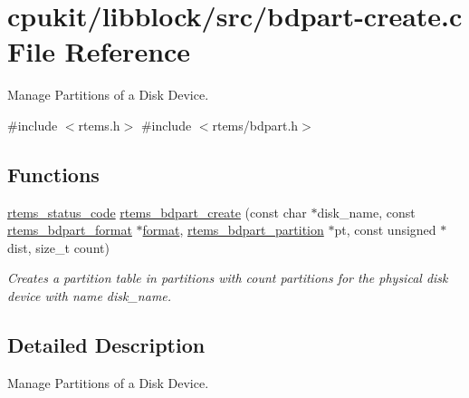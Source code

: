 \hypertarget{bdpart-create_8c}{}\section{cpukit/libblock/src/bdpart-\/create.c File Reference}
\label{bdpart-create_8c}


Manage Partitions of a Disk Device.  


{\ttfamily \#include $<$rtems.\+h$>$}\newline
{\ttfamily \#include $<$rtems/bdpart.\+h$>$}\newline
\subsection*{Functions}
\begin{DoxyCompactItemize}
\item 
\mbox{\hyperlink{group__ClassicStatus_ga545d41846817eaba6143d52ee4d9e9fe}{rtems\+\_\+status\+\_\+code}} \mbox{\hyperlink{group__rtems__bdpart_ga208abbe74a399a6e38115ab8eeab6eb5}{rtems\+\_\+bdpart\+\_\+create}} (const char $\ast$disk\+\_\+name, const \mbox{\hyperlink{unionrtems__bdpart__format}{rtems\+\_\+bdpart\+\_\+format}} $\ast$\mbox{\hyperlink{structformat}{format}}, \mbox{\hyperlink{structrtems__bdpart__partition}{rtems\+\_\+bdpart\+\_\+partition}} $\ast$pt, const unsigned $\ast$dist, size\+\_\+t count)
\begin{DoxyCompactList}\small\item\em Creates a partition table in {\itshape partitions} with {\itshape count} partitions for the physical disk device with name {\itshape disk\+\_\+name}. \end{DoxyCompactList}\end{DoxyCompactItemize}


\subsection{Detailed Description}
Manage Partitions of a Disk Device. 

